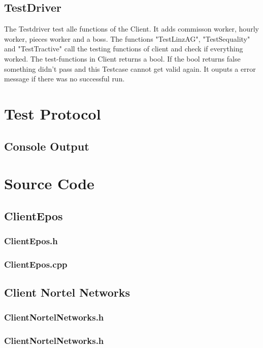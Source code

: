 \subsection{TestDriver}
The Testdriver test alle functions of the Client. It adds commisson worker, hourly worker, pieces worker and a boss.
The functions "TestLinzAG", "TestSequality" and "TestTractive" call the testing functions of client and check if everything worked.
The test-functions in Client returns a bool. If the bool returns false something didn't pass and this Testcase cannot get valid again.
It ouputs a error message if there was no successful run.

\newpage
\section{Test Protocol}


\subsection{Console Output}


\section{Source Code}

\subsection{ClientEpos}
\subsubsection{ClientEpos.h}
\subsubsection{ClientEpos.cpp}
\newpage
\subsection{Client Nortel Networks}
\subsubsection{ClientNortelNetworks.h}
\subsubsection{ClientNortelNetworks.h}
\newpage

